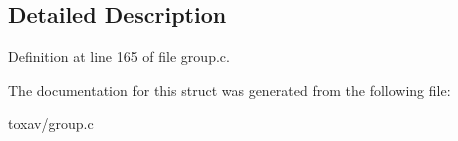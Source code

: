\subsection{Detailed Description}


Definition at line 165 of file group.\+c.



The documentation for this struct was generated from the following file\+:\begin{DoxyCompactItemize}
\item 
toxav/group.\+c\end{DoxyCompactItemize}
